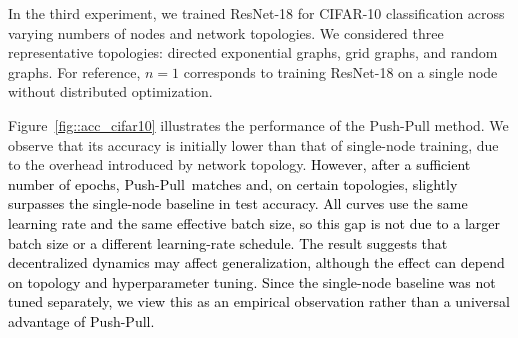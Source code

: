 \documentclass[10pt]{article}
\newcommand{\pushpull}{{\sc Push-Pull}\xspace}
\newcommand{\revision}[1]{\textcolor{black}{#1}}
\begin{document}
In the third experiment, we trained ResNet-18 for CIFAR-10 classification across varying numbers of nodes and network topologies.  
We considered three representative topologies: directed exponential graphs, grid graphs, and random graphs.  
For reference, $n=1$ corresponds to training ResNet-18 on a single node without distributed optimization.  

Figure~\ref{fig::acc_cifar10} illustrates the performance of the \pushpull method.
We observe that its accuracy is initially lower than that of single-node training, due to the overhead introduced by network topology.
\revision{However, after a sufficient number of epochs, \pushpull\ matches and, on certain topologies, slightly surpasses the single-node baseline in test accuracy. All curves use the same learning rate and the same effective batch size, so this gap is not due to a larger batch size or a different learning-rate schedule. The result suggests that decentralized dynamics may affect generalization, although the effect can depend on topology and hyperparameter tuning. Since the single-node baseline was not tuned separately, we view this as an empirical observation rather than a universal advantage of \pushpull.}
\end{document}
